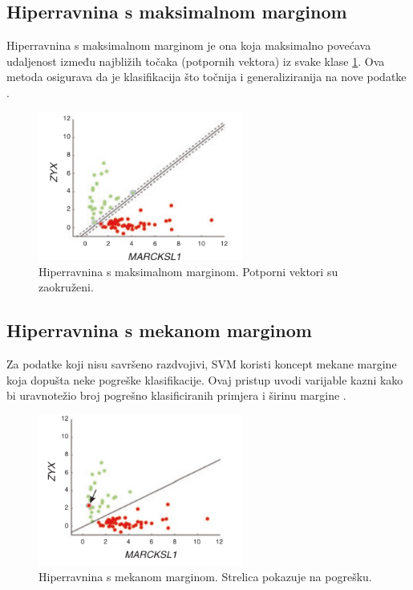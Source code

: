 \documentclass[zavrsnirad,upload]{fer}
\begin{document}
\subsection{Hiperravnina s maksimalnom marginom}
Hiperravnina s maksimalnom marginom je ona koja maksimalno povećava udaljenost između najbližih točaka (potpornih vektora) iz svake klase \ref{fig:maks_marg}. Ova metoda osigurava da je klasifikacija što točnija i generaliziranija na nove podatke \cite{Noble2006}.
\begin{figure}[h]
	\centering
	\includegraphics[width=0.6\textwidth]{Figures/maks_margina.png}
	\caption{Hiperravnina s maksimalnom marginom. Potporni vektori su zaokruženi. \cite{Noble2006}}
	\label{fig:maks_marg}
\end{figure}

\subsection{Hiperravnina s mekanom marginom}
Za podatke koji nisu savršeno razdvojivi, SVM koristi koncept mekane margine koja dopušta neke pogreške klasifikacije. Ovaj pristup uvodi varijable kazni kako bi uravnotežio broj pogrešno klasificiranih primjera i širinu margine \cite{fletcher2009}.
\begin{figure}[h]
	\centering
	\includegraphics[width=0.6\textwidth]{Figures/soft_margin.png}
	\caption{Hiperravnina s mekanom marginom. Strelica pokazuje na pogrešku. \cite{Noble2006}}
	\label{fig:soft_margin}
\end{figure}
\end{document}

